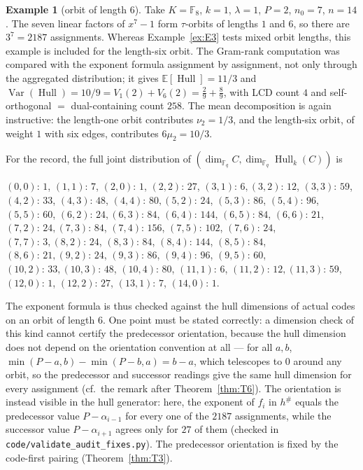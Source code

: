 \documentclass[10pt,journal,draftclsnofoot,onecolumn]{IEEEtran}
\theoremstyle{definition}
\newtheorem{example}[theorem]{Example}
\theoremstyle{remark}
\newcommand{\Fq}{\mathbb{F}_q}
\newcommand{\Hull}{\operatorname{Hull}}
\newcommand{\E}{\mathbb{E}}
\begin{document}
\begin{example}[orbit of length \(6\)]\label{ex:E4}
Take \(K = \mathbb{F}_8\), \(k=1\), \(\lambda=1\), \(P=2\), \(n_0=7\),
\(n=14\). The seven linear factors of \(x^7-1\) form \(\tau\)-orbits
of lengths \(1\) and \(6\), so there are \(3^7 = 2187\) assignments.
Whereas Example~\ref{ex:E3} tests mixed orbit lengths, this example is
included for the length-six orbit. The Gram-rank computation was
compared with the exponent formula assignment by assignment, not only
through the aggregated distribution; it gives
\(\E[\Hull] = 11/3\) and
\(\operatorname{Var}(\Hull) = 10/9 = V_1(2) + V_6(2) = \tfrac29 +
\tfrac89\), with LCD count \(4\) and self-orthogonal \(=\) dual-containing
count \(258\). The mean decomposition is again instructive: the
length-one orbit contributes \(\nu_2 = 1/3\), and the length-six orbit,
of weight \(1\) with six edges, contributes \(6\mu_2 = 10/3\).

For the record, the full joint distribution of
\((\dim_{\Fq} C, \dim_{\Fq}\Hull_k(C))\) is
\par{\footnotesize\raggedright
\((0,0){:}\,1\), \((1,1){:}\,7\), \((2,0){:}\,1\), \((2,2){:}\,27\), \((3,1){:}\,6,
(3,2){:}\,12\), \((3,3){:}\,59\), \((4,2){:}\,33\), \((4,3){:}\,48\), \((4,4){:}\,80,
(5,2){:}\,24\), \((5,3){:}\,86\), \((5,4){:}\,96\), \((5,5){:}\,60\), \((6,2){:}\,24,
(6,3){:}\,84\), \((6,4){:}\,144\), \((6,5){:}\,84\), \((6,6){:}\,21\), \((7,2){:}\,24,
(7,3){:}\,84\), \((7,4){:}\,156\), \((7,5){:}\,102\), \((7,6){:}\,24\), \((7,7){:}\,3,
(8,2){:}\,24\), \((8,3){:}\,84\), \((8,4){:}\,144\), \((8,5){:}\,84\), \((8,6){:}\,21,
(9,2){:}\,24\), \((9,3){:}\,86\), \((9,4){:}\,96\), \((9,5){:}\,60\), \((10,2){:}\,33,
(10,3){:}\,48\), \((10,4){:}\,80\), \((11,1){:}\,6\), \((11,2){:}\,12,
(11,3){:}\,59\), \((12,0){:}\,1\), \((12,2){:}\,27\), \((13,1){:}\,7\), \((14,0){:}\,1\).\par}

The exponent formula is thus checked against the hull dimensions of
actual codes on an orbit of length \(6\). One point must be stated
correctly: a dimension check of this kind cannot certify the predecessor
orientation, because the hull dimension does not depend on the
orientation convention at all --- for all \(a, b\),
\(\min(P-a,b) - \min(P-b,a) = b - a\), which telescopes to \(0\) around
any orbit, so the predecessor and successor readings give the same hull
dimension for every assignment (cf.\ the remark after
Theorem~\ref{thm:T6}). The orientation is instead visible in the hull
generator: here, the exponent of \(f_i\) in \(h^{\#}\) equals the
predecessor value \(P - \alpha_{i-1}\) for every one of the \(2187\)
assignments, while the successor value \(P - \alpha_{i+1}\) agrees only
for \(27\) of them (checked in
\texttt{code/}\allowbreak\texttt{validate\_audit\_fixes.py}). The predecessor orientation is
fixed by the code-first pairing (Theorem~\ref{thm:T3}).
\end{example}
\end{document}
